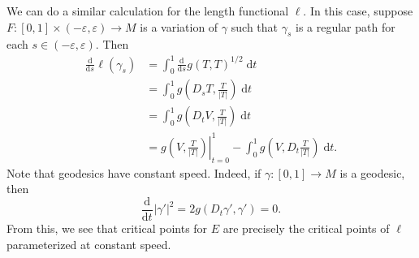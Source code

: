 \documentclass{book}
\renewcommand{\d}{\mathrm{d}}
\renewcommand{\epsilon}{\varepsilon}
\newcommand{\abs}[1]{\left\lvert {#1} \right\rvert}
\newcommand{\parens}[1]{\left( {#1} \right)}
\newcommand{\odv}[3][]{\frac{\d^{#1}#2}{\d{#3}^{#1}}}
\theoremstyle{definition}
\numberwithin{equation}{section}
\begin{document}
We can do a similar calculation for the length functional $\ell$. In this case, suppose $F \colon [0,1] \times (-\epsilon,\epsilon) \to M$ is a variation of $\gamma$ such that $\gamma_s$ is a regular path for each $s \in (-\epsilon,\epsilon)$. Then 
\begin{equation} \begin{aligned}
    \odv{}{s} \ell(\gamma_s) &= \int_0^1 \odv{}{s} g(T,T)^{1/2} \; \d{t} \\
                             &= \int_0^1 g\parens{ D_s T, \frac{T}{\abs{T}} } \; \d{t} \\
                             &= \int_0^1 g\parens{ D_t V, \frac{T}{\abs{T}} } \; \d{t} \\
                             &= \left. g\parens{ V,\frac{T}{\abs{T}} } \right\vert_{t=0}^1 - \int_0^1 g\parens{ V, D_t \frac{T}{\abs{T}} } \; \d{t}.
\end{aligned} \end{equation}
Note that geodesics have constant speed. Indeed, if $\gamma \colon [0,1] \to M$ is a geodesic, then 
\begin{equation}
    \odv{}{t} \abs{\gamma'}^2 = 2g(D_t \gamma',\gamma') = 0.
\end{equation}
From this, we see that critical points for $E$ are precisely the critical points of $\ell$ parameterized at constant speed.
\end{document}
